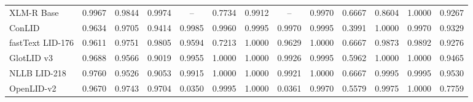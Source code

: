 \documentclass[conference]{IEEEtran}
\begin{document}
\begin{table}[p]
\begin{tabular}{l ccc cccccccc c}
\midrule
XLM-R Base & 0.9967 & 0.9844 & 0.9974 & -- & 0.7734 & 0.9912 & -- & 0.9970 & 0.6667 & 0.8604 & 1.0000 & 0.9267 \\
ConLID & 0.9634 & 0.9705 & 0.9414 & 0.9985 & 0.9960 & 0.9995 & 0.9970 & 0.9995 & 0.3991 & 1.0000 & 0.9970 & 0.9329 \\
fastText LID-176 & 0.9611 & 0.9751 & 0.9805 & 0.9594 & 0.7213 & 1.0000 & 0.9629 & 1.0000 & 0.6667 & 0.9873 & 0.9892 & 0.9276 \\
GlotLID v3 & 0.9688 & 0.9566 & 0.9019 & 0.9955 & 1.0000 & 1.0000 & 0.9926 & 0.9995 & 0.5962 & 1.0000 & 1.0000 & 0.9465 \\
NLLB LID-218 & 0.9760 & 0.9526 & 0.9053 & 0.9915 & 1.0000 & 1.0000 & 0.9921 & 1.0000 & 0.6667 & 0.9995 & 0.9995 & 0.9530 \\
OpenLID-v2 & 0.9670 & 0.9743 & 0.9704 & 0.0350 & 0.9995 & 1.0000 & 0.0361 & 0.9970 & 0.5579 & 0.9975 & 1.0000 & 0.7759 \\
\bottomrule
\end{tabular}

\vspace{10pt}


\end{table}
\end{document}
